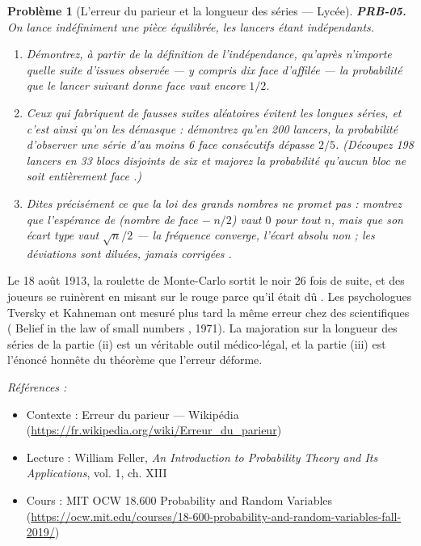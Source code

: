 \documentclass[11pt]{article}
\newtheorem{problem}{Problème}
\newenvironment{refs}{\par\small\noindent\emph{Références :}\begin{itemize}\setlength\itemsep{0pt}}{\end{itemize}\normalsize}
\begin{document}
\bigskip

\begin{problem}[{L'erreur du parieur et la longueur des séries --- Lycée}]
\textbf{PRB-05.} On lance indéfiniment une pièce équilibrée, les lancers étant indépendants.
\begin{enumerate}
\item[(i)] Démontrez, à partir de la définition de l'indépendance, qu'après n'importe quelle suite
d'issues observée --- y compris dix \og{} face \fg{} d'affilée --- la probabilité que le lancer suivant donne
\og{} face \fg{} vaut encore $ 1/2 $.
\item[(ii)] Ceux qui fabriquent de fausses suites \og{} aléatoires \fg{} évitent les longues séries, et c'est
ainsi qu'on les démasque : démontrez qu'en 200 lancers, la probabilité d'observer une série d'au
moins 6 \og{} face \fg{} consécutifs dépasse $ 2/5 $. (Découpez 198 lancers en 33 blocs disjoints de
six et majorez la probabilité qu'aucun bloc ne soit entièrement \og{} face \fg{}.)
\item[(iii)] Dites
précisément ce que la loi des grands nombres ne promet \textit{pas} : montrez que l'espérance de
(nombre de \og{} face \fg{} $ - \; n/2 $) vaut $ 0 $ pour tout $ n $, mais que son écart type vaut
$ \sqrt{n}/2 $ --- la fréquence converge, l'écart absolu non ; les déviations sont diluées, jamais
\og{} corrigées \fg{}.
\end{enumerate}

\end{problem}

\noindent Le 18 août 1913, la roulette de Monte-Carlo sortit le noir 26 fois de suite, et
des joueurs se ruinèrent en misant sur le rouge \og{} parce qu'il était dû \fg{}. Les psychologues Tversky
et Kahneman ont mesuré plus tard la même erreur chez des scientifiques (\og{} Belief in the law of
small numbers \fg{}, 1971). La majoration sur la longueur des séries de la partie (ii) est un
véritable outil médico-légal, et la partie (iii) est l'énoncé honnête du théorème que l'erreur
déforme.

\begin{refs}
\item Contexte : Erreur du parieur --- Wikipédia (\url{https://fr.wikipedia.org/wiki/Erreur_du_parieur})
\item Lecture : William Feller, \textit{An Introduction to Probability Theory and Its Applications}, vol. 1, ch. XIII
\item Cours : MIT OCW 18.600 Probability and Random Variables (\url{https://ocw.mit.edu/courses/18-600-probability-and-random-variables-fall-2019/})
\end{refs}
\end{document}
